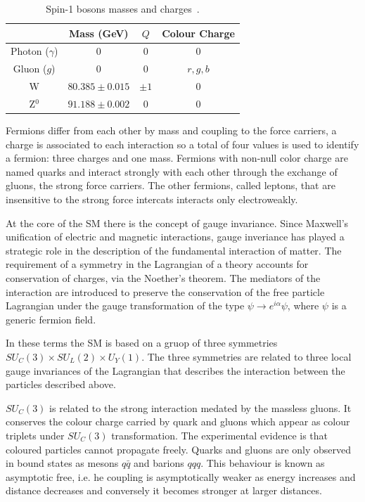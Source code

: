 \begin{table}[ht]
  \begin{center}
    \begin{tabular}{|c|c|c|c|}
    \hline
    & Mass (GeV)
    & $Q$
    & Colour Charge \\
    \hline
      \hline
      Photon ($\gamma$) & 0 & 0 & 0 \\
      Gluon ($g$) & 0 & 0 & $r,g,b$ \\
      W & $80.385 \pm 0.015$ & $\pm 1$ & 0 \\
      Z$^0$ & $91.188 \pm 0.002$ & 0 & 0 \\
    \hline
    \end{tabular}
  \end{center}
  \caption{Spin-1 bosons masses and charges~\cite{PDG}.}
  \label{tab:bosons}
\end{table}

Fermions differ from each other by mass and coupling to the force carriers, a charge is associated
to each interaction so a total of four values is used to identify a fermion: three charges and one mass.
Fermions with non-null color charge are named quarks and interact strongly with each other through the exchange
of gluons, the strong force carriers. The other fermions, called leptons, that are insensitive to
the strong force intercats interacts only electroweakly.

At the core of the SM there is the concept of gauge invariance.
Since Maxwell's unification of electric and magnetic interactions, gauge inveriance
has played a strategic role in the description of the fundamental interaction of matter.
The requirement of a symmetry in the Lagrangian of a theory accounts for conservation of
charges, via the Noether's theorem.
The mediators of the interaction are introduced to preserve the conservation of
the free particle Lagrangian under the gauge transformation of the type $\psi \to e^{i\alpha}\psi$, where
$\psi$ is a generic fermion field.

In these terms the SM is based on a gruop of three symmetries $SU_C(3)\times SU_L(2) \times U_Y(1)$.
The three symmetries are related to three local gauge invariances of the Lagrangian that describes the interaction
between the particles described above.

$SU_C(3)$ is related to the strong interaction medated by the massless gluons. It conserves the colour charge
carried by quark and gluons which appear as colour triplets under $SU_C(3)$ transformation.
The experimental evidence is that coloured particles cannot propagate freely.
Quarks and gluons are only observed in bound states as mesons $q\bar{q}$ and barions $qqq$.
This behaviour is known as
asymptotic free, i.e. he coupling is asymptotically weaker as energy increases and distance decreases
and conversely it becomes stronger at larger distances.

